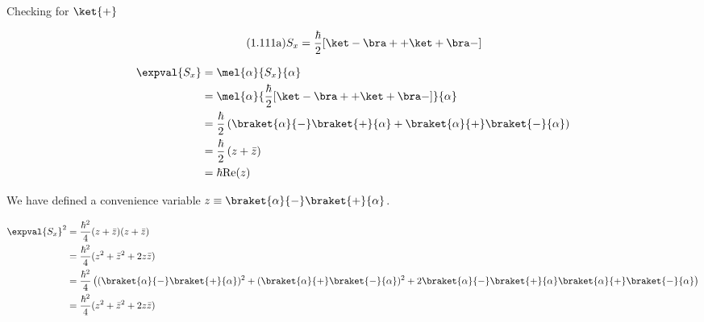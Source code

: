 \begin{answer}

  \begin{answerpart}{Checking for \texorpdfstring{$\ket{+}$}{|+>}}

    \begin{equation}
      \tag{1.111a}
      S_x = \frac{\hbar}{2} [\ket - \bra + + \ket + \bra - ]
    \end{equation}

    \begin{equation}
      \begin{split}
        \expval{S_x}
        &= \mel{\alpha}{S_x}{\alpha}\\
        &= \mel{\alpha}{\frac{\hbar}{2} [\ket - \bra + + \ket + \bra - ]}{\alpha}\\
        &=
        \frac{\hbar}{2}
        \left(
        \braket{\alpha}{-}
        \braket{+}{\alpha}
        +
        \braket{\alpha}{+}
        \braket{-}{\alpha}
        \right)\\
        &=
        \frac{\hbar}{2}
        \left(
        z
        +
        \bar{z}
        \right)\\
        &= \hbar\text{Re}(z)\\
      \end{split}
    \end{equation}

    We have defined a convenience variable $z \equiv
    \braket{\alpha}{-}\braket{+}{\alpha}$.

    \begin{equation}
      \begin{split}
        \expval{S_x}^2
        &= \frac{\hbar^2}{4}(z + \bar{z})(z + \bar{z})\\
        &= \frac{\hbar^2}{4}(z^2 + \bar{z}^2 + 2z\bar{z})\\
        &= \frac{\hbar^2}{4}\left(
        (\braket{\alpha}{-}\braket{+}{\alpha})^2
        + (\braket{\alpha}{+}\braket{-}{\alpha})^2
        + 2
        \braket{\alpha}{-}\braket{+}{\alpha}
        \braket{\alpha}{+}\braket{-}{\alpha}
        \right)\\
        &= \frac{\hbar^2}{4}(z^2 + \bar{z}^2 + 2z\bar{z})\\
      \end{split}
    \end{equation}


\end{answerpart}
\end{answer}
